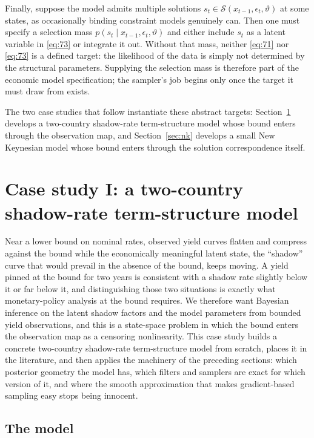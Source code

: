 \documentclass[11pt]{article}
\begin{document}
Finally, suppose the model admits multiple solutions
$s_t\in\mathcal S(x_{t-1},\epsilon_t,\vartheta)$ at some states, as
occasionally binding constraint models genuinely can. Then one must specify a
selection mass $p(s_t\mid x_{t-1},\epsilon_t,\vartheta)$ and either include
$s_t$ as a latent variable in \eqref{eq:73} or integrate it out. Without that
mass, neither \eqref{eq:71} nor \eqref{eq:73} is a defined target: the
likelihood of the data is simply not determined by the structural parameters.
Supplying the selection mass is therefore part of the economic model
specification; the sampler's job begins only once the target it must draw
from exists.

The two case studies that follow instantiate these abstract targets:
Section~\ref{sec:shadow} develops a two-country shadow-rate term-structure model whose
bound enters through the observation map, and Section~\ref{sec:nk} develops a small New
Keynesian model whose bound enters through the solution correspondence itself.

\section{Case study I: a two-country shadow-rate term-structure model}
\label{sec:shadow}

Near a lower bound on nominal rates, observed yield curves flatten and
compress against the bound while the economically meaningful latent
state, the ``shadow'' curve that would prevail in the absence of the
bound, keeps moving. A yield pinned at the bound for two years is
consistent with a shadow rate slightly below it or far below it, and
distinguishing those two situations is exactly what monetary-policy
analysis at the bound requires. We therefore want Bayesian inference on
the latent shadow factors and the model parameters from bounded yield
observations, and this is a state-space problem in which the bound
enters the observation map as a censoring nonlinearity. This case study
builds a concrete two-country shadow-rate term-structure model from
scratch, places it in the literature, and then applies the machinery of
the preceding sections: which posterior geometry the model has, which
filters and samplers are exact for which version of it, and where the
smooth approximation that makes gradient-based sampling easy stops
being innocent.

\subsection{The model}
\label{sec:shadow-model}
\end{document}
